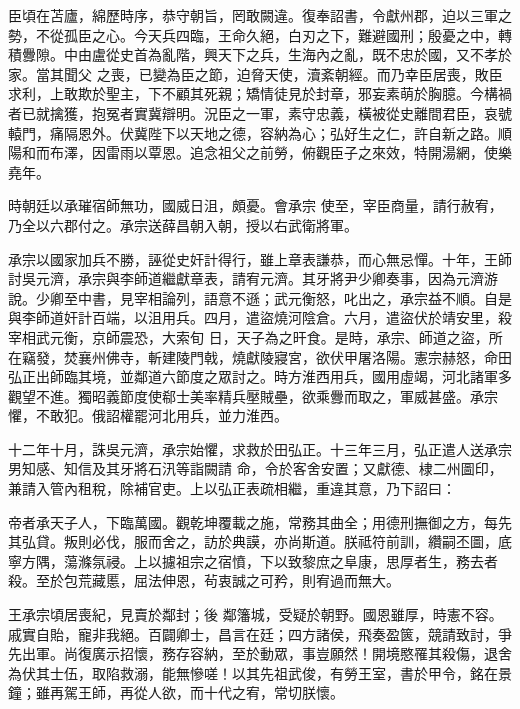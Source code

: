\begin{pinyinscope}
 臣頃在苫廬，綿歷時序，恭守朝旨，罔敢闕違。復奉詔書，令獻州郡，迫以三軍之勢，不從孤臣之心。今天兵四臨，王命久絕，白刃之下，難避國刑；殷憂之中，轉積釁隙。中由盧從史首為亂階，興天下之兵，生海內之亂，既不忠於國，又不孝於家。當其聞父
 之喪，已變為臣之節，迫脅天使，瀆紊朝經。而乃幸臣居喪，敗臣求利，上敢欺於聖主，下不顧其死親；矯情徒見於封章，邪妄素萌於胸臆。今構禍者已就擒獲，抱冤者實冀辯明。況臣之一軍，素守忠義，橫被從史離間君臣，哀號轅門，痛隔恩外。伏冀陛下以天地之德，容納為心；弘好生之仁，許自新之路。順陽和而布澤，因雷雨以覃恩。追念祖父之前勞，俯觀臣子之來效，特開湯網，使樂堯年。



 時朝廷以承璀宿師無功，國威日沮，頗憂。會承宗
 使至，宰臣商量，請行赦宥，乃全以六郡付之。承宗送薛昌朝入朝，授以右武衛將軍。



 承宗以國家加兵不勝，誣從史奸計得行，雖上章表謙恭，而心無忌憚。十年，王師討吳元濟，承宗與李師道繼獻章表，請宥元濟。其牙將尹少卿奏事，因為元濟游說。少卿至中書，見宰相論列，語意不遜；武元衡怒，叱出之，承宗益不順。自是與李師道奸計百端，以沮用兵。四月，遣盜燒河陰倉。六月，遣盜伏於靖安里，殺宰相武元衡，京師震恐，大索旬
 日，天子為之旰食。是時，承宗、師道之盜，所在竊發，焚襄州佛寺，斬建陵門戟，燒獻陵寢宮，欲伏甲屠洛陽。憲宗赫怒，命田弘正出師臨其境，並鄰道六節度之眾討之。時方淮西用兵，國用虛竭，河北諸軍多觀望不進。獨昭義節度使郗士美率精兵壓賊壘，欲乘釁而取之，軍威甚盛。承宗懼，不敢犯。俄詔權罷河北用兵，並力淮西。



 十二年十月，誅吳元濟，承宗始懼，求救於田弘正。十三年三月，弘正遣人送承宗男知感、知信及其牙將石汛等詣闕請
 命，令於客舍安置；又獻德、棣二州圖印，兼請入管內租稅，除補官吏。上以弘正表疏相繼，重違其意，乃下詔曰：



 帝者承天子人，下臨萬國。觀乾坤覆載之施，常務其曲全；用德刑撫御之方，每先其弘貸。叛則必伐，服而舍之，訪於典謨，亦尚斯道。朕祗符前訓，纘嗣丕圖，底寧方隅，蕩滌氛祲。上以攄祖宗之宿憤，下以致黎庶之阜康，思厚者生，務去者殺。至於包荒藏慝，屈法伸恩，茍衷誠之可矜，則宥過而無大。



 王承宗頃居喪紀，見賣於鄰封；後
 鄰籓城，受疑於朝野。國恩雖厚，時憲不容。戚實自貽，寵非我絕。百闢卿士，昌言在廷；四方諸侯，飛奏盈篋，競請致討，爭先出軍。尚復廣示招懷，務存容納，至於動眾，事豈願然！開境愍罹其殺傷，退舍為伏其士伍，取陷救溺，能無慘嗟！以其先祖武俊，有勞王室，書於甲令，銘在景鐘；雖再駕王師，再從人欲，而十代之宥，常切朕懷。




\end{pinyinscope}
